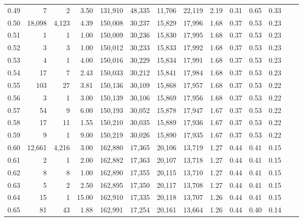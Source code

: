 \begin{tabular}{rrrrrrrrrrrrrr}
0.49 &       7 &      2 &    3.50 &  131,910 &   48,335 &  11,706 &  22,119 &  2.19 &  0.31 &  0.65 &      0.33 \\
0.50 &  18,098 &  4,123 &    4.39 &  150,008 &   30,237 &  15,829 &  17,996 &  1.68 &  0.37 &  0.53 &      0.23 \\
0.51 &       1 &      1 &    1.00 &  150,009 &   30,236 &  15,830 &  17,995 &  1.68 &  0.37 &  0.53 &      0.23 \\
0.52 &       3 &      3 &    1.00 &  150,012 &   30,233 &  15,833 &  17,992 &  1.68 &  0.37 &  0.53 &      0.23 \\
0.53 &       4 &      1 &    4.00 &  150,016 &   30,229 &  15,834 &  17,991 &  1.68 &  0.37 &  0.53 &      0.23 \\
0.54 &      17 &      7 &    2.43 &  150,033 &   30,212 &  15,841 &  17,984 &  1.68 &  0.37 &  0.53 &      0.23 \\
0.55 &     103 &     27 &    3.81 &  150,136 &   30,109 &  15,868 &  17,957 &  1.68 &  0.37 &  0.53 &      0.22 \\
0.56 &       3 &      1 &    3.00 &  150,139 &   30,106 &  15,869 &  17,956 &  1.68 &  0.37 &  0.53 &      0.22 \\
0.57 &      54 &      9 &    6.00 &  150,193 &   30,052 &  15,878 &  17,947 &  1.67 &  0.37 &  0.53 &      0.22 \\
0.58 &      17 &     11 &    1.55 &  150,210 &   30,035 &  15,889 &  17,936 &  1.67 &  0.37 &  0.53 &      0.22 \\
0.59 &       9 &      1 &    9.00 &  150,219 &   30,026 &  15,890 &  17,935 &  1.67 &  0.37 &  0.53 &      0.22 \\
0.60 &  12,661 &  4,216 &    3.00 &  162,880 &   17,365 &  20,106 &  13,719 &  1.27 &  0.44 &  0.41 &      0.15 \\
0.61 &       2 &      1 &    2.00 &  162,882 &   17,363 &  20,107 &  13,718 &  1.27 &  0.44 &  0.41 &      0.15 \\
0.62 &       8 &      8 &    1.00 &  162,890 &   17,355 &  20,115 &  13,710 &  1.27 &  0.44 &  0.41 &      0.15 \\
0.63 &       5 &      2 &    2.50 &  162,895 &   17,350 &  20,117 &  13,708 &  1.27 &  0.44 &  0.41 &      0.15 \\
0.64 &      15 &      1 &   15.00 &  162,910 &   17,335 &  20,118 &  13,707 &  1.26 &  0.44 &  0.41 &      0.15 \\
0.65 &      81 &     43 &    1.88 &  162,991 &   17,254 &  20,161 &  13,664 &  1.26 &  0.44 &  0.40 &      0.14 \\

\end{tabular}

